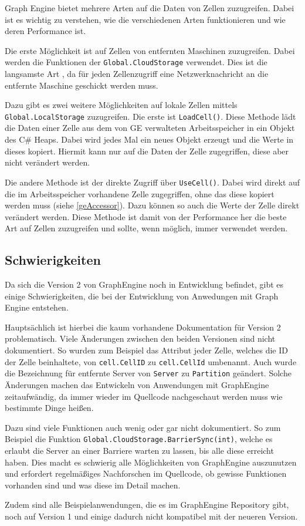 Graph Engine bietet mehrere Arten auf die Daten von Zellen zuzugreifen. Dabei ist es wichtig zu verstehen, wie die verschiedenen Arten funktionieren und wie deren Performance ist.

Die erste Möglichkeit ist auf Zellen von entfernten Maschinen zuzugreifen. Dabei werden die Funktionen der \verb|Global.CloudStorage| verwendet. Dies ist die langsamste Art , da für jeden Zellenzugriff eine Netzwerknachricht an die entfernte Maschine geschickt werden muss.

Dazu gibt es zwei weitere Möglichkeiten auf lokale Zellen mittels \verb|Global.LocalStorage| zuzugreifen. Die erste ist \verb|LoadCell()|. Diese Methode lädt die Daten einer Zelle aus dem von GE verwalteten Arbeitsspeicher in ein Objekt des C\# Heaps.
Dabei wird jedes Mal ein neues Objekt erzeugt und die Werte in dieses kopiert. Hiermit kann nur auf die Daten der Zelle zugegriffen, diese aber nicht verändert werden.

Die andere Methode ist der direkte Zugriff über \verb|UseCell()|. Dabei wird direkt auf die im Arbeitsspeicher vorhandene Zelle zugegriffen, ohne das diese kopiert werden muss (siehe \ref{geAccessor}). Dazu können so auch die Werte der Zelle direkt verändert werden. Diese Methode ist damit von der Performance her die beste Art auf Zellen zuzugreifen und sollte, wenn möglich, immer verwendet werden.



\subsection{Schwierigkeiten}

Da sich die Version 2 von GraphEngine noch in Entwicklung befindet, gibt es einige Schwierigkeiten, die bei der Entwicklung von Anwedungen mit Graph Engine entstehen.

Hauptsächlich ist hierbei die kaum vorhandene Dokumentation für Version 2 problematisch. Viele Änderungen zwischen den beiden Versionen sind nicht dokumentiert. So wurden zum Beispiel
das Attribut jeder Zelle, welches die ID der Zelle beinhaltete, von \verb|cell.CellID| zu \verb|cell.CellId| umbenannt. Auch wurde die Bezeichnung für entfernte Server von \verb|Server| zu \verb|Partition| geändert.
Solche Änderungen machen das Entwickeln von Anwendungen mit GraphEngine zeitaufwändig, da immer wieder im Quellcode nachgeschaut werden muss wie bestimmte Dinge heißen. 

Dazu sind viele Funktionen auch wenig oder gar nicht dokumentiert. So zum Beispiel die Funktion \verb|Global.CloudStorage.BarrierSync(int)|, welche es erlaubt die Server an einer Barriere warten zu lassen, bis alle diese erreicht haben.
Dies macht es schwierig alle Möglichkeiten von GraphEngine auszunutzen und erfordert regelmäßiges Nachforschen im Quellcode, ob gewisse Funktionen vorhanden sind und was diese im Detail machen.

Zudem sind alle Beispielanwendungen, die es im GraphEngine Repository gibt, noch auf Version 1 und einige dadurch nicht kompatibel mit der neueren Version.


